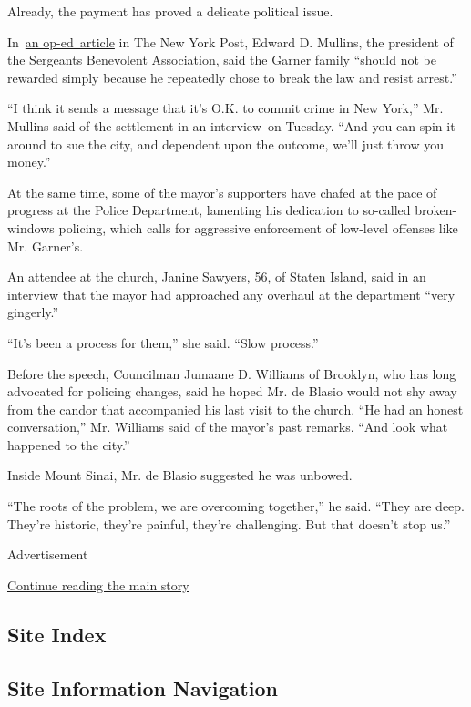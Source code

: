Already, the payment has proved a delicate political issue.

In~\href{http://nypost.com/2015/07/14/nypd-union-head-on-the-citys-obscene-eric-garner-settlement/}{an
op-ed~article} in The New York Post, Edward D. Mullins, the president of
the Sergeants Benevolent Association, said the Garner family ``should
not be rewarded simply because he repeatedly chose to break the law and
resist arrest.''

``I think it sends a message that it's O.K. to commit crime in New
York,'' Mr. Mullins said of the settlement in an interview~on Tuesday.
``And you can spin it around to sue the city, and dependent upon the
outcome, we'll just throw you money.''

At the same time, some of the mayor's supporters have chafed at the pace
of progress at the Police Department, lamenting his dedication to
so-called broken-windows policing, which calls for aggressive
enforcement of low-level offenses like Mr. Garner's.

An attendee at the church, Janine Sawyers, 56, of Staten Island, said in
an interview that the mayor had approached any overhaul at the
department ``very gingerly.''

``It's been a process for them,'' she said. ``Slow process.''

Before the speech, Councilman Jumaane D. Williams of Brooklyn, who has
long advocated for policing changes, said he hoped Mr. de Blasio would
not shy away from the candor that accompanied his last visit to the
church. ``He had an honest conversation,'' Mr. Williams said of the
mayor's past remarks. ``And look what happened to the city.''

Inside Mount Sinai, Mr. de Blasio suggested he was unbowed.

``The roots of the problem, we are overcoming together,'' he said.
``They are deep. They're historic, they're painful, they're challenging.
But that doesn't stop us.''

Advertisement

\protect\hyperlink{after-bottom}{Continue reading the main story}

\hypertarget{site-index}{%
\subsection{Site Index}\label{site-index}}

\hypertarget{site-information-navigation}{%
\subsection{Site Information
Navigation}\label{site-information-navigation}}

